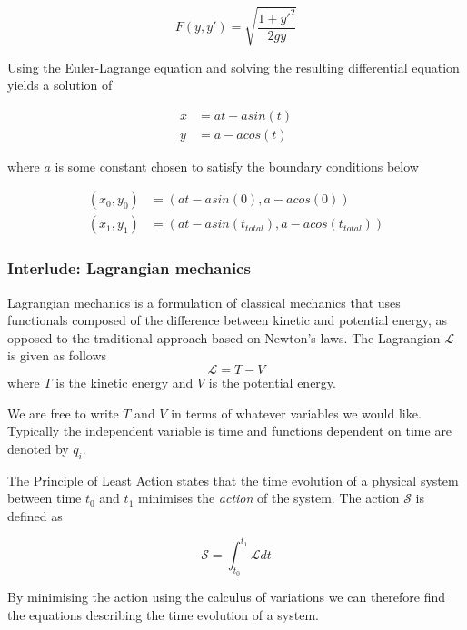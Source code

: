 \documentclass[]{article}
\begin{document}
\begin{equation} F(y,y') = \sqrt{\frac{1+y'^{2}}{2gy}} \end{equation}

Using the Euler-Lagrange equation and solving the resulting differential equation yields a solution of

\begin{equation} \begin{split} x & = at - asin(t)\\
y & = a-acos(t) \end{split} \end{equation}

where $a$ is some constant chosen to satisfy the boundary conditions below

\begin{equation} \begin{split} (x_{0}, y_{0}) & = (at - asin(0), a-acos(0)) \\
(x_{1}, y_{1}) & = (at - asin(t_{total}), a-acos(t_{total})) \end{split} \end{equation}

\subsubsection{Interlude: Lagrangian mechanics}
Lagrangian mechanics is a formulation of classical mechanics that uses functionals composed of the difference between kinetic and potential energy, as opposed to the traditional approach based on Newton's laws. The Lagrangian $\mathcal{L}$ is given as follows
\begin{equation} \mathcal{L} = T - V \end{equation}
where $T$ is the kinetic energy and $V$ is the potential energy. 

We are free to write $T$ and $V$ in terms of whatever variables we would like. Typically the independent variable is time and functions dependent on time are denoted by $q_{i}$.

The Principle of Least Action states that the time evolution of a physical system between time $t_{0}$ and $t_{1}$ minimises the \textit{action} of the system. The action $\mathcal{S}$ is defined as 

\begin{equation} \mathcal{S} = \int_{t_{0}}^{t_{1}} \mathcal{L} dt \end{equation}

By minimising the action using the calculus of variations we can therefore find the equations describing the time evolution of a system.
\end{document}

